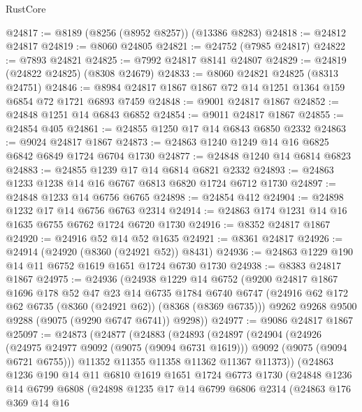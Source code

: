 \begin{lexlean}{RustCore}
\begin{coremodule}
@24817 := @8189 (@8256 (@8952 @8257)) (@13386 @8283)
@24818 := @24812 @24817
@24819 := @8060 @24805
@24821 := @24752 (@7985 @24817)
@24822 := @7893 @24821
@24825 := @7992 @24817 @8141 @24807
@24829 := @24819 (@24822 @24825) (@8308 @24679)
@24833 := @8060 @24821 @24825 (@8313 @24751)
@24846 := @8984 @24817 @1867 @1867 @72 @14 @1251 @1364 @159 @6854 @72 @1721 @6893 @7459
@24848 := @9001 @24817 @1867
@24852 := @24848 @1251 @14 @6843 @6852
@24854 := @9011 @24817 @1867
@24855 := @24854 @405
@24861 := @24855 @1250 @17 @14 @6843 @6850 @2332
@24863 := @9024 @24817 @1867
@24873 := @24863 @1240 @1249 @14 @16 @6825 @6842 @6849 @1724 @6704 @1730
@24877 := @24848 @1240 @14 @6814 @6823
@24883 := @24855 @1239 @17 @14 @6814 @6821 @2332
@24893 := @24863 @1233 @1238 @14 @16 @6767 @6813 @6820 @1724 @6712 @1730
@24897 := @24848 @1233 @14 @6756 @6765
@24898 := @24854 @412
@24904 := @24898 @1232 @17 @14 @6756 @6763 @2314
@24914 := @24863 @174 @1231 @14 @16 @1635 @6755 @6762 @1724 @6720 @1730
@24916 := @8352 @24817 @1867
@24920 := @24916 @52 @14 @52 @1635
@24921 := @8361 @24817
@24926 := @24914 (@24920 (@8360 (@24921 @52)) @8431)
@24936 := @24863 @1229 @190 @14 @11 @6752 @1619 @1651 @1724 @6730 @1730
@24938 := @8383 @24817 @1867
@24975 := @24936
    (@24938
      @1229
      @14
      @6752
      (@9200
        @24817
        @1867
        @1696
        @178
        @52
        @47
        @23
        @14
        @6735
        @1784
        @6740
        @6747
        (@24916 @62 @172 @62 @6735 (@8360 (@24921 @62)) (@8368 (@8369 @6735)))
        @9262
        @9268
        @9500
        @9288
        (@9075 (@9290 @6747 @6741))
        @9298))
@24977 := @9086 @24817 @1867
@25097 := @24873
    (@24877
      (@24883
        (@24893
          (@24897
            (@24904
              (@24926
                (@24975 @24977 @9092 (@9075 (@9094 @6731 @1619)))
                @9092
                (@9075 (@9094 @6721 @6755)))
              @11352
              @11355
              @11358
              @11362
              @11367
              @11373))
          (@24863
            @1236
            @190
            @14
            @11
            @6810
            @1619
            @1651
            @1724
            @6773
            @1730
            (@24848
              @1236
              @14
              @6799
              @6808
              (@24898
                @1235
                @17
                @14
                @6799
                @6806
                @2314
                (@24863
                  @176
                  @369
                  @14
                  @16

\end{coremodule}
\end{lexlean}
